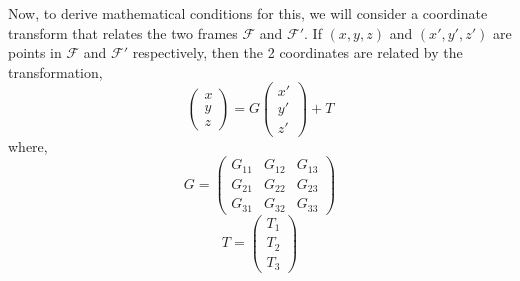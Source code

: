 \documentclass[a4paper,12pt,draft]{report}
\begin{document}
Now, to derive mathematical conditions for this, we will consider a coordinate transform that relates the two frames $\mathcal{F}$ and $\mathcal{F'}$. If $(x, y, z)$ and $(x', y', z')$ are points in $\mathcal{F}$ and $\mathcal{F'}$ respectively, then the 2 coordinates are related by the transformation,
\begin{equation}
\begin{pmatrix}x\\y\\z\end{pmatrix} = G\begin{pmatrix}x'\\y'\\z'\end{pmatrix} + T
\end{equation}
where,
$$
G =
\begin{pmatrix}
G_{11} & G_{12} & G_{13}\\
G_{21} & G_{22} & G_{23}\\
G_{31} & G_{32} & G_{33}
\end{pmatrix}
$$
$$
T = \begin{pmatrix}T_1\\T_2\\T_3\end{pmatrix}
$$
\end{document}
